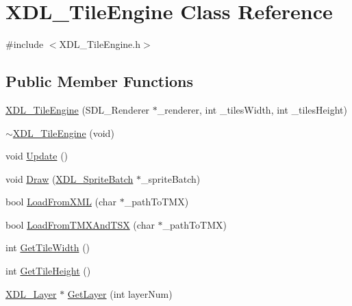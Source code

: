 \hypertarget{class_x_d_l___tile_engine}{\section{X\-D\-L\-\_\-\-Tile\-Engine Class Reference}
\label{class_x_d_l___tile_engine}
}


{\ttfamily \#include $<$X\-D\-L\-\_\-\-Tile\-Engine.\-h$>$}

\subsection*{Public Member Functions}
\begin{DoxyCompactItemize}
\item 
\hyperlink{class_x_d_l___tile_engine_a98bee762bf2317a9835fe08d43c72d3e}{X\-D\-L\-\_\-\-Tile\-Engine} (S\-D\-L\-\_\-\-Renderer $\ast$\-\_\-renderer, int \-\_\-tiles\-Width, int \-\_\-tiles\-Height)
\item 
\hyperlink{class_x_d_l___tile_engine_a821e376c855b2a35a26c42d7c3536798}{$\sim$\-X\-D\-L\-\_\-\-Tile\-Engine} (void)
\item 
void \hyperlink{class_x_d_l___tile_engine_a09b4b351ebcb85a637c6324eca20f7ae}{Update} ()
\item 
void \hyperlink{class_x_d_l___tile_engine_ac64a769f7337304d90d9597fd9cd9a41}{Draw} (\hyperlink{class_x_d_l___sprite_batch}{X\-D\-L\-\_\-\-Sprite\-Batch} $\ast$\-\_\-sprite\-Batch)
\item 
bool \hyperlink{class_x_d_l___tile_engine_a768bab50a988a2bb6f329709fb57f5ce}{Load\-From\-X\-M\-L} (char $\ast$\-\_\-path\-To\-T\-M\-X)
\item 
bool \hyperlink{class_x_d_l___tile_engine_a8f6d9ab1bd0bb21d403cde2e5980cb9d}{Load\-From\-T\-M\-X\-And\-T\-S\-X} (char $\ast$\-\_\-path\-To\-T\-M\-X)
\item 
int \hyperlink{class_x_d_l___tile_engine_acc054aba7cc81238b2101f562fdeaeed}{Get\-Tile\-Width} ()
\item 
int \hyperlink{class_x_d_l___tile_engine_a5c7c48bcfc59c2e0c5c03dad43c52d7a}{Get\-Tile\-Height} ()
\item 
\hyperlink{class_x_d_l___layer}{X\-D\-L\-\_\-\-Layer} $\ast$ \hyperlink{class_x_d_l___tile_engine_aab7ccf749e184493f526bbdab9a22f96}{Get\-Layer} (int layer\-Num)
\end{DoxyCompactItemize}


